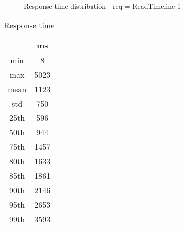 \begin{minipage}{0.75\linewidth}
\begin{figure}[h]
\begin{adjustbox}{max width=1.0\linewidth, keepaspectratio}
  \end{adjustbox}
  \caption{Response time distribution - req = ReadTimeline-1}
\end{figure}
\end{minipage}\hfill\begin{minipage}{0.18\linewidth}
\begin{table}[h]
\begin{tabular}{|cc|}
\hline
\textbf{} & \textbf{ms}\\ \hline
 \Xhline{0.005\arrayrulewidth}
min & 8\\
 \Xhline{0.005\arrayrulewidth}
max & 5023\\
 \Xhline{0.005\arrayrulewidth}
mean & 1123\\
 \Xhline{0.005\arrayrulewidth}
std & 750\\
\hline
\hline
 \Xhline{0.005\arrayrulewidth}
25th & 596\\
 \Xhline{0.005\arrayrulewidth}
50th & 944\\
 \Xhline{0.005\arrayrulewidth}
75th & 1457\\
 \Xhline{0.005\arrayrulewidth}
80th & 1633\\
 \Xhline{0.005\arrayrulewidth}
85th & 1861\\
 \Xhline{0.005\arrayrulewidth}
90th & 2146\\
 \Xhline{0.005\arrayrulewidth}
95th & 2653\\
 \Xhline{0.005\arrayrulewidth}
99th & 3593\\
\hline
\end{tabular}
\caption{Response time}
\end{table}
\end{minipage}\hfill